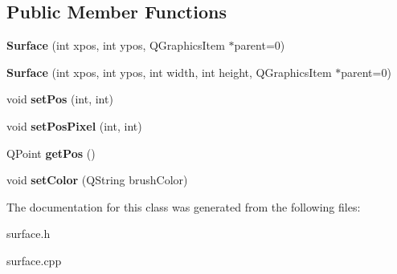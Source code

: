 \subsection*{Public Member Functions}
\begin{DoxyCompactItemize}
\item 
\hypertarget{class_surface_ac03bea7e4e17982fd17f8a571035a6f0}{}{\bfseries Surface} (int xpos, int ypos, Q\+Graphics\+Item $\ast$parent=0)\label{class_surface_ac03bea7e4e17982fd17f8a571035a6f0}

\item 
\hypertarget{class_surface_a3e1af81e4723f854196608b966a86415}{}{\bfseries Surface} (int xpos, int ypos, int width, int height, Q\+Graphics\+Item $\ast$parent=0)\label{class_surface_a3e1af81e4723f854196608b966a86415}

\item 
\hypertarget{class_surface_a025ed38853ae95be3c6fe8814711ffc3}{}void {\bfseries set\+Pos} (int, int)\label{class_surface_a025ed38853ae95be3c6fe8814711ffc3}

\item 
\hypertarget{class_surface_ab63590ebca0d813b110aa286400eac72}{}void {\bfseries set\+Pos\+Pixel} (int, int)\label{class_surface_ab63590ebca0d813b110aa286400eac72}

\item 
\hypertarget{class_surface_acbdbf91a4cca74bb9da6c8a2fa932cd7}{}Q\+Point {\bfseries get\+Pos} ()\label{class_surface_acbdbf91a4cca74bb9da6c8a2fa932cd7}

\item 
\hypertarget{class_surface_ab7dd076ec71f2d6a63fe60f6c011786b}{}void {\bfseries set\+Color} (Q\+String brush\+Color)\label{class_surface_ab7dd076ec71f2d6a63fe60f6c011786b}

\end{DoxyCompactItemize}


The documentation for this class was generated from the following files\+:\begin{DoxyCompactItemize}
\item 
surface.\+h\item 
surface.\+cpp\end{DoxyCompactItemize}
